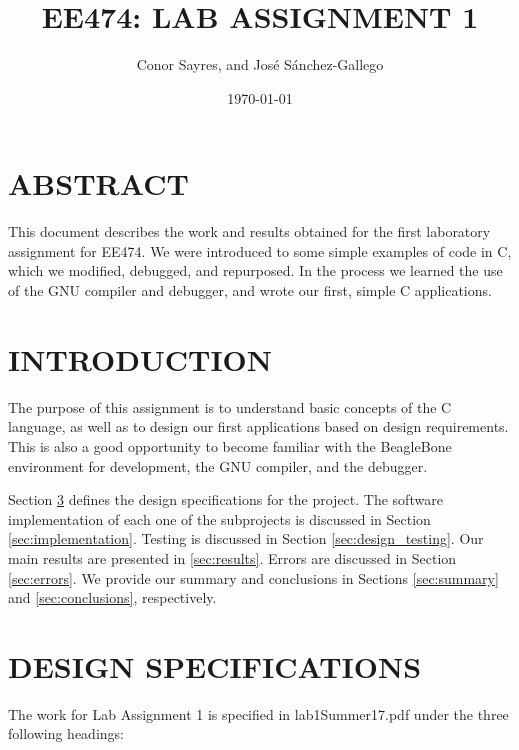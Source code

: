 \documentclass[letterpaper, 12pt]{article}
\begin{document}
\title{\vspace{30mm}EE474: LAB ASSIGNMENT 1}
\author{Conor Sayres, and José Sánchez-Gallego}
\date{\today}

\maketitle

\thispagestyle{empty}

\clearpage

\tableofcontents
\thispagestyle{empty}

\clearpage


\section{ABSTRACT}

This document describes the work and results obtained for the first laboratory assignment for EE474. We were introduced to some simple examples of code in C, which we modified, debugged, and repurposed. In the process we learned the use of the GNU compiler and debugger, and wrote our first, simple C applications.


\section{INTRODUCTION}

The purpose of this assignment is to understand basic concepts of the C language, as well as to design our first applications based on design requirements. This is also a good opportunity to become familiar with the BeagleBone environment for development, the GNU compiler, and the debugger.

Section \ref{sec:design} defines the design specifications for the project. The software implementation of each one of the subprojects is discussed in Section \ref{sec:implementation}. Testing is discussed in Section \ref{sec:design_testing}. Our main results are presented in \ref{sec:results}. Errors are discussed in Section \ref{sec:errors}. We provide our summary and conclusions in Sections \ref{sec:summary} and \ref{sec:conclusions}, respectively.


\section{DESIGN SPECIFICATIONS}
\label{sec:design}

The work for Lab Assignment 1 is specified in lab1Summer17.pdf under the three following headings:
\end{document}
